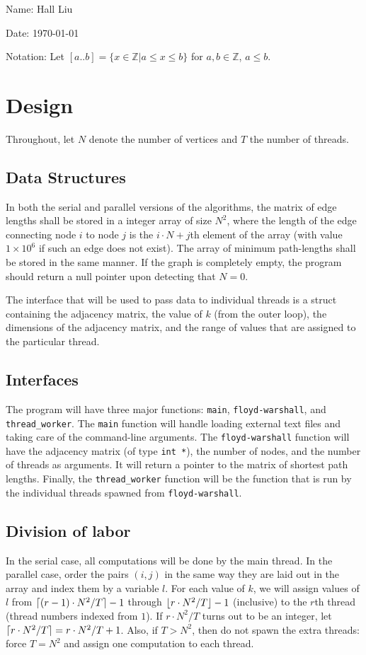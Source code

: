 \documentclass{article}
\newcommand{\zn}{\mathbb{Z}}
\DeclarePairedDelimiter\ceil{\lceil}{\rceil}
\DeclarePairedDelimiter\floor{\lfloor}{\rfloor}
\begin{document}
Name: Hall Liu

Date: \today 
\vspace{20pt}

\noindent Notation: Let $[a..b]=\{x\in\zn|a\leq x\leq b\}$ for $a,b\in\zn$, $a\leq b$.
\section*{Design}
Throughout, let $N$ denote the number of vertices and $T$ the number of threads.
\subsection*{Data Structures}
In both the serial and parallel versions of the algorithms, the matrix of edge lengths shall be stored in a integer array of size $N^2$, where the length of the edge connecting node $i$ to node $j$ is the $i\cdot N+j$th element of the array (with value $1\times10^6$ if such an edge does not exist). The array of minimum path-lengths shall be stored in the same manner. If the graph is completely empty, the program should return a null pointer upon detecting that $N=0$.

The interface that will be used to pass data to individual threads is a struct containing the adjacency matrix, the value of $k$ (from the outer loop), the dimensions of the adjacency matrix, and the range of values that are assigned to the particular thread.
\subsection*{Interfaces}
The program will have three major functions: \verb|main|, \verb|floyd-warshall|, and \verb|thread_worker|. The \verb|main| function will handle loading external text files and taking care of the command-line arguments. The \verb|floyd-warshall| function will have the adjacency matrix (of type \verb|int *|), the number of nodes, and the number of threads as arguments. It will return a pointer to the matrix of shortest path lengths. Finally, the \verb|thread_worker| function will be the function that is run by the individual threads spawned from \verb|floyd-warshall|.
\subsection*{Division of labor}
In the serial case, all computations will be done by the main thread. In the parallel case, order the pairs $(i,j)$ in the same way they are laid out in the array and index them by a variable $l$. For each value of $k$, we will assign values of $l$ from $\ceil{(r-1)\cdot N^2/T}-1$ through $\floor{r\cdot N^2/T}-1$ (inclusive) to the $r$th thread (thread numbers indexed from $1$). If $r\cdot N^2/T$ turns out to be an integer, let $\ceil{r\cdot N^2/T}=r\cdot N^2/T + 1$. Also, if $T>N^2$, then do not spawn the extra threads: force $T=N^2$ and assign one computation to each thread.
\end{document}
